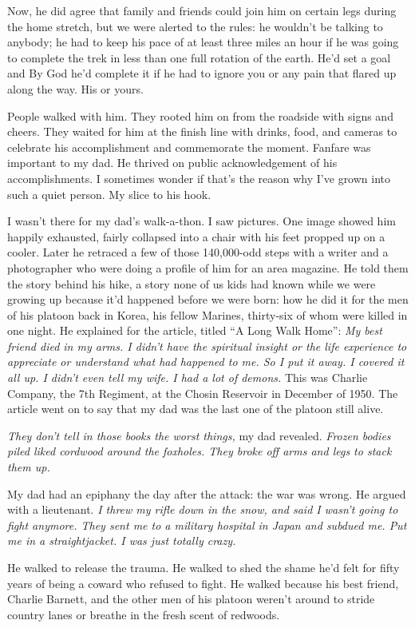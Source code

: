 \documentclass[12pt]{book}
\begin{document}
Now, he did agree that family and friends could join him on certain legs during the home stretch, but we were alerted to the rules: he wouldn't be talking to anybody; he had to keep his pace of at least three miles an hour if he was going to complete the trek in less than one full rotation of the earth. He'd set a goal and By God he'd complete it if he had to ignore you or any pain that flared up along the way. His or yours.

People walked with him. They rooted him on from the roadside with signs and cheers. They waited for him at the finish line with drinks, food, and cameras to celebrate his accomplishment and commemorate the moment. Fanfare was important to my dad. He thrived on public acknowledgement of his accomplishments. I sometimes wonder if that's the reason why I've grown into such a quiet person. My slice to his hook.

I wasn't there for my dad's walk-a-thon. I saw pictures. One image showed him happily exhausted, fairly collapsed into a chair with his feet propped up on a cooler. Later he retraced a few of those 140,000-odd steps with a writer and a photographer who were doing a profile of him for an area magazine. He told them the story behind his hike, a story none of us kids had known while we were growing up because it'd happened before we were born: how he did it for the men of his platoon back in Korea, his fellow Marines, thirty-six of whom were killed in one night. He explained for the article, titled ``A Long Walk Home'': \textit{My best friend died in my arms. I didn't have the spiritual insight or the life experience to appreciate or understand what had happened to me. So I put it away. I covered it all up. I didn't even tell my wife. I had a lot of demons.} This was Charlie Company, the 7th Regiment, at the Chosin Reservoir in December of 1950. The article went on to say that my dad was the last one of the platoon still alive.

\textit{They don't tell in those books the worst things,} my dad revealed. \textit{Frozen bodies piled liked cordwood around the foxholes. They broke off arms and legs to stack them up.}

My dad had an epiphany the day after the attack: the war was wrong. He argued with a lieutenant. \textit{I threw my rifle down in the snow, and said I wasn't going to fight anymore. They sent me to a military hospital in Japan and subdued me. Put me in a straightjacket. I was just totally crazy.}

He walked to release the trauma. He walked to shed the shame he'd felt for fifty years of being a coward who refused to fight. He walked because his best friend, Charlie Barnett, and the other men of his platoon weren't around to stride country lanes or breathe in the fresh scent of redwoods.
\end{document}
